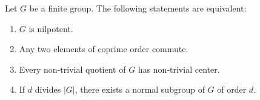 
\begin{exercise}
\label{xca:nilpotente_equivalencia}
	Let $G$ be a finite group. The following statements are equivalent:
	\begin{enumerate}
		\item $G$ is nilpotent.
		\item Any two elements of coprime order commute. 
		\item Every non-trivial quotient of $G$ has non-trivial center.
		\item If $d$ divides $|G|$, there exists a normal subgroup of $G$ of order $d$. 
		\end{enumerate}
\end{exercise}


